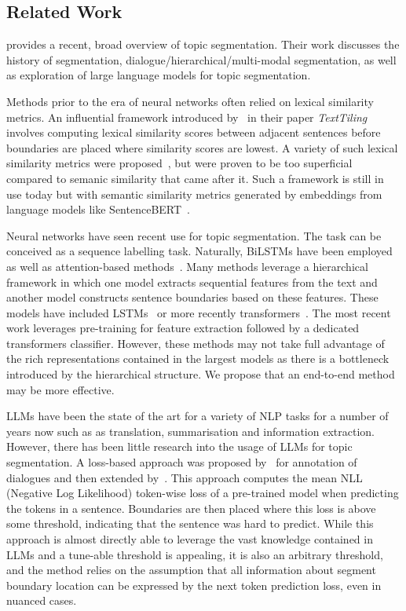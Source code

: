 \subsection{Related Work}

\citep{XingThesis} provides a recent, broad overview of topic segmentation. Their work discusses the history of segmentation, dialogue/hierarchical/multi-modal segmentation, as well as exploration of large language models for topic segmentation.

Methods prior to the era of neural networks often relied on lexical similarity metrics. An influential framework introduced by~\citep{TextTiling} in their paper \emph{TextTiling} involves computing lexical similarity scores between adjacent sentences before boundaries are placed where similarity scores are lowest. A variety of such lexical similarity metrics were proposed~\citep{lexical1,lexical2}, but were proven to be too superficial compared to semanic similarity that came after it. Such a framework is still in use today but with semantic similarity metrics generated by embeddings from language models like SentenceBERT~\citep{SentenceBERT}.

Neural networks have seen recent use for topic segmentation. The task can be conceived as a sequence labelling task. Naturally, BiLSTMs have been employed~\citep{BiLSTM} as well as attention-based methods~\cite{CrossAttentionHierarchical}. Many methods leverage a hierarchical framework in which one model extracts sequential features from the text and another model constructs sentence boundaries based on these features. These models have included LSTMs~\cite{HierarchicalBiLSTM,CNNFeaturesLSTMAttention} or more recently transformers~\citep{TwoLevelTransformerSoftmax,TwoLevelTransformerPretrained}. The most recent work leverages pre-training for feature extraction followed by a dedicated transformers classifier. However, these methods may not take full advantage of the rich representations contained in the largest models as there is a bottleneck introduced by the hierarchical structure. We propose that an end-to-end method may be more effective.

LLMs have been the state of the art for a variety of NLP tasks for a number of years now such as as translation, summarisation and information extraction. However, there has been little research into the usage of LLMs for topic segmentation. A loss-based approach was proposed by~\citep{DialoGPT} for annotation of dialogues and then extended by~\citep{XingThesis}. This approach computes the mean NLL (Negative Log Likelihood) token-wise loss of a pre-trained model when predicting the tokens in a sentence. Boundaries are then placed where this loss is above some threshold, indicating that the sentence was hard to predict. While this approach is almost directly able to leverage the vast knowledge contained in LLMs and a tune-able threshold is appealing, it is also an arbitrary threshold, and the method relies on the assumption that all information about segment boundary location can be expressed by the next token prediction loss, even in nuanced cases.

